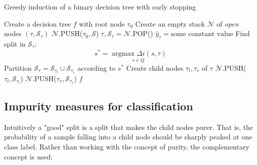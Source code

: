 \documentclass[12pt,a4paper]{article}
\begin{document}
\begin{algorithm} 
	\caption{Greedy induction of a binary decision tree with early stopping}\label{algo:decision-tree}
	\begin{algorithmic}[1]
		\State Create a decision tree $f$ with root node $\tau_0$ 
		\State Create an empty stack $\mathcal N$ of \textit{open} nodes $(\tau, \mathcal S_\tau)$ 
		\State $\mathcal N$.PUSH($\tau_0, \mathcal S$)
		\State $\tau, \mathcal S_\tau = \mathcal N$.POP()
		\State $\hat y_\tau = \text{some constant value}$ 
		\Else{}
		 \State Find split in $\mathcal S_\tau$: $$s^*= \underset{s\in Q}{\operatorname{argmax} \Delta i (s,\tau) }$$
		 \State Partition $\mathcal S_\tau = \mathcal S_{\tau_l} \cup \mathcal S_{\tau_r}$ according to $s^*$
		 \State Create child nodes $\tau_l, \tau_r$ of $\tau$
		 \State $\mathcal N$.PUSH($\tau_l, \mathcal S_{\tau_l}$)
		 \State $\mathcal N$.PUSH($\tau_r, \mathcal S_{\tau_r}$)
		\EndIf
		\EndWhile
		\Return $f$
		\EndProcedure
	\end{algorithmic}
\end{algorithm}

\subsection{Impurity measures for classification}
Intuitively a "good" split is a split that makes the child nodes purer. That is, the probability of a sample falling into a child node should be sharply peaked at one class label. Rather than working with the concept of purity, the complementary concept is used\cite{cart84}:
\end{document}
